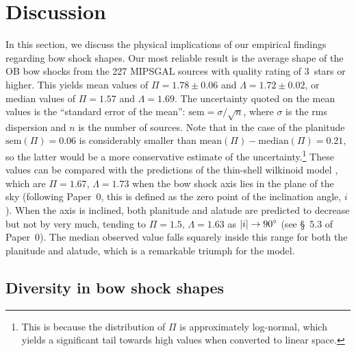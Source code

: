 
\section{Discussion}
\label{sec:discussion}

In this section, we discuss the physical implications of our empirical
findings regarding bow shock shapes.  Our most reliable result is the
average shape of the OB bow shocks from the 227 MIPSGAL sources with
quality rating of 3~stars or higher.  This yields mean values of
\(\Pi = 1.78 \pm 0.06\) and \(\Lambda = 1.72 \pm 0.02\), or median values of
\(\Pi = 1.57\) and \(\Lambda = 1.69\).  The uncertainty quoted on the mean
values is the ``standard error of the mean'':
\(\text{sem} = \sigma / \sqrt{n}\), where \(\sigma\) is the rms dispersion and
\(n\) is the number of sources.  Note that in the case of the
planitude \(\text{sem}(\Pi) = 0.06\) is considerably smaller than
\(\text{mean}(\Pi) - \text{median}(\Pi) = 0.21\), so the latter would be a
more conservative estimate of the uncertainty.\footnote{This is
  because the distribution of \(\Pi\) is approximately log-normal, which
  yields a significant tail towards high values when converted to
  linear space.}  These values can be compared with the predictions of
the thin-shell wilkinoid model \citep{Wilkin:1996a}, which are
\(\Pi = 1.67\), \(\Lambda = 1.73\) when the bow shock axis lies in the plane
of the sky (following Paper~0, this is defined as the zero point of
the inclination angle, \(i\)).  When the axis is inclined, both
planitude and alatude are predicted to decrease but not by very much,
tending to \(\Pi = 1.5\), \(\Lambda = 1.63\) as
\(\lvert i\rvert \to \ang{90}\) (see \S~5.3 of Paper~0).  The median observed
value falls squarely inside this range for both the planitude and
alatude, which is a remarkable triumph for the \citet{Wilkin:1996a}
model.

\subsection{Diversity in bow shock shapes}
\label{sec:diversity-bow-shock}

